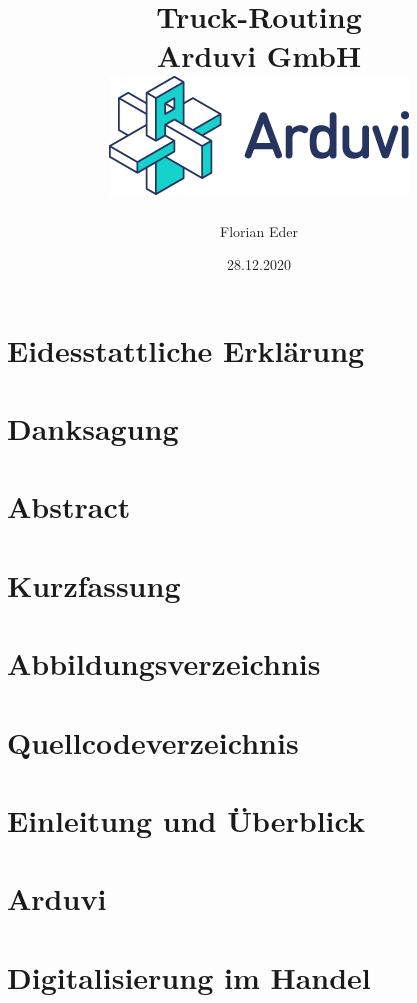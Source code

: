 \documentclass[12pt]{report}
\title {
    {Truck-Routing}\\
    {\large Arduvi GmbH}\\
    {\includegraphics{ArduviLogoWithText.png}}
}
\author{Florian Eder}
\date{28.12.2020}
\begin{document}
    \maketitle

    \chapter*{Eidesstattliche Erklärung}
    

    \chapter*{Danksagung}
    

    \chapter*{Abstract}
    

    \chapter*{Kurzfassung}
    

    \tableofcontents

    \chapter*{Abbildungsverzeichnis}
    

    \chapter*{Quellcodeverzeichnis}
    


    \chapter{Einleitung und Überblick}
    

    \chapter{Arduvi}
    

    \chapter{Digitalisierung im Handel}
    
\end{document}

